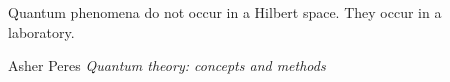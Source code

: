


\begin{refsection}

\begin{quoting}
   \openquote 
   Quantum phenomena do not occur in a Hilbert space. They occur in a
   laboratory.~\closequote
   \begin{flushright}
       Asher Peres 
       \emph{Quantum theory: concepts and methods}
    \end{flushright}
\end{quoting}



\printbibliography[heading=subbibliography]
\end{refsection}

